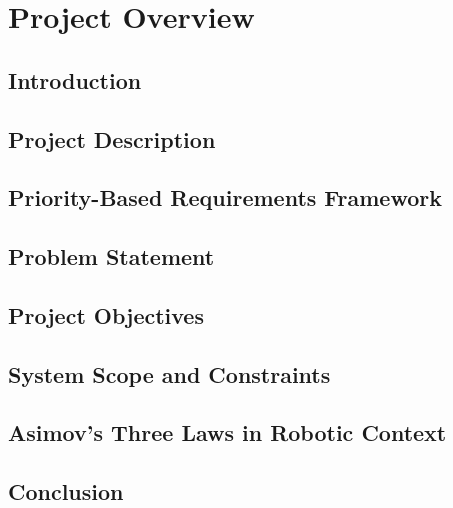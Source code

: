 \chapter{Project Overview }

\section{Introduction}

\section{Project Description}

\section{Priority-Based Requirements Framework}

\section{Problem Statement}

\section{Project Objectives}

\section{System Scope and Constraints}

\section{Asimov's Three Laws in Robotic Context}

\section{Conclusion}


